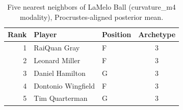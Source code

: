 \begin{table}[htbp]
  \centering\small
  \begin{tabular}{rllc}
    \toprule
    Rank & Player & Position & Archetype \\
    \midrule
    1 & RaiQuan Gray & F & 3 \\
    2 & Leonard Miller & F & 3 \\
    3 & Daniel Hamilton & G & 3 \\
    4 & Dontonio Wingfield & F & 3 \\
    5 & Tim Quarterman & G & 3 \\
    \bottomrule
  \end{tabular}
  \caption{Five nearest neighbors of LaMelo Ball (curvature_m4 modality), Procrustes-aligned posterior mean.}
  \label{tab:LaMelo_Ball_neighbors_curvature_m4}
\end{table}

